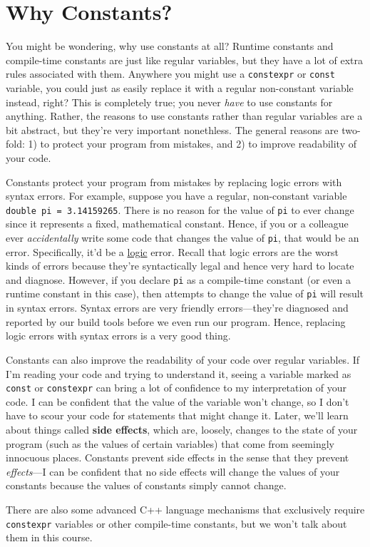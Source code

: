 \documentclass{article}
\begin{document}
\section{Why Constants?}

You might be wondering, why use constants at all? Runtime constants and compile-time constants are just like regular variables, but they have a lot of extra rules associated with them. Anywhere you might use a \texttt{constexpr} or \texttt{const} variable, you could just as easily replace it with a regular non-constant variable instead, right? This is completely true; you never \textit{have} to use constants for anything. Rather, the reasons to use constants rather than regular variables are a bit abstract, but they're very important nonethless. The general reasons are two-fold: 1) to protect your program from mistakes, and 2) to improve readability of your code.

Constants protect your program from mistakes by replacing logic errors with syntax errors. For example, suppose you have a regular, non-constant variable \texttt{double pi = 3.14159265}. There is no reason for the value of \texttt{pi} to ever change since it represents a fixed, mathematical constant. Hence, if you or a colleague ever \textit{accidentally} write some code that changes the value of \texttt{pi}, that would be an error. Specifically, it'd be a \ul{logic} error. Recall that logic errors are the worst kinds of errors because they're syntactically legal and hence very hard to locate and diagnose. However, if you declare \texttt{pi} as a compile-time constant (or even a runtime constant in this case), then attempts to change the value of \texttt{pi} will result in syntax errors. Syntax errors are very friendly errors---they're diagnosed and reported by our build tools before we even run our program. Hence, replacing logic errors with syntax errors is a very good thing.

Constants can also improve the readability of your code over regular variables. If I'm reading your code and trying to understand it, seeing a variable marked as \texttt{const} or \texttt{constexpr} can bring a lot of confidence to my interpretation of your code. I can be confident that the value of the variable won't change, so I don't have to scour your code for statements that might change it. Later, we'll learn about things called \textbf{side effects}, which are, loosely, changes to the state of your program (such as the values of certain variables) that come from seemingly innocuous places. Constants prevent side effects in the sense that they prevent \textit{effects}---I can be confident that no side effects will change the values of your constants because the values of constants simply cannot change.

There are also some advanced C++ language mechanisms that exclusively require \texttt{constexpr} variables or other compile-time constants, but we won't talk about them in this course.
\end{document}

